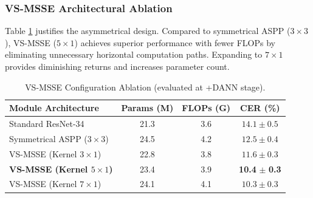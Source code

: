 \documentclass[11pt]{article}
\begin{document}
\subsubsection{VS-MSSE Architectural Ablation}
Table \ref{tab:msse_ablation} justifies the asymmetrical design. Compared to symmetrical ASPP ($3\times3$), VS-MSSE ($5\times1$) achieves superior performance with fewer FLOPs by eliminating unnecessary horizontal computation paths. Expanding to $7\times1$ provides diminishing returns and increases parameter count. 

\begin{table}[htbp]
\centering
\caption{VS-MSSE Configuration Ablation (evaluated at +DANN stage).}
\label{tab:msse_ablation}
\begin{tabular}{l c c c}
\toprule
\textbf{Module Architecture} & \textbf{Params (M)} & \textbf{FLOPs (G)} & \textbf{CER (\%)} \\
\midrule
Standard ResNet-34 & 21.3 & 3.6 & $14.1 \pm 0.5$ \\
Symmetrical ASPP ($3\times3$) & 24.5 & 4.2 & $12.5 \pm 0.4$ \\
VS-MSSE (Kernel $3\times1$) & 22.8 & 3.8 & $11.6 \pm 0.3$ \\
\textbf{VS-MSSE (Kernel $5\times1$)} & 23.4 & 3.9 & \textbf{10.4} $\pm$ \textbf{0.3} \\
VS-MSSE (Kernel $7\times1$) & 24.1 & 4.1 & $10.3 \pm 0.3$ \\
\bottomrule
\end{tabular}
\end{table}
\end{document}

